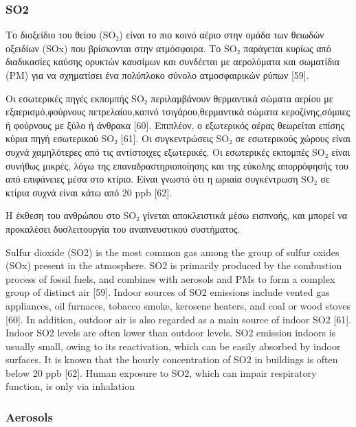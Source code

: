 \subsubsection{SO2}

Το διοξείδιο του θείου (SO₂) είναι το πιο κοινό αέριο στην ομάδα των θειωδών οξειδίων (SOx) που βρίσκονται στην ατμόσφαιρα. Το SO₂ παράγεται κυρίως από διαδικασίες καύσης ορυκτών καυσίμων και συνδέεται με αερολύματα και σωματίδια (PM) για να σχηματίσει ένα πολύπλοκο σύνολο ατμοσφαιρικών ρύπων [59].

Οι εσωτερικές πηγές εκπομπής SO₂ περιλαμβάνουν θερμαντικά σώματα αερίου με εξαερισμό,φούρνους πετρελαίου,καπνό τσιγάρου,θερμαντικά σώματα κεροζίνης,σόμπες ή φούρνους με ξύλο ή άνθρακα [60].
Επιπλέον, ο εξωτερικός αέρας θεωρείται επίσης κύρια πηγή εσωτερικού SO₂ [61]. Οι συγκεντρώσεις SO₂ σε εσωτερικούς χώρους είναι συχνά χαμηλότερες από τις αντίστοιχες εξωτερικές. Οι εσωτερικές εκπομπές SO₂ είναι συνήθως μικρές, λόγω της επαναδραστηριοποίησης και της εύκολης απορρόφησής του από επιφάνειες μέσα στο κτίριο. Είναι γνωστό ότι η ωριαία συγκέντρωση SO₂ σε κτίρια συχνά είναι κάτω από 20 ppb [62].

Η έκθεση του ανθρώπου στο SO₂ γίνεται αποκλειστικά μέσω εισπνοής, και μπορεί να προκαλέσει δυσλειτουργία του αναπνευστικού συστήματος.

Sulfur dioxide (SO2) is the most common gas among the group of sulfur oxides (SOx) present in the atmosphere. SO2 is primarily produced by the combustion process of fossil fuels, and combines with aerosols and PMs to form a complex group of distinct air [59]. Indoor sources of SO2 emissions include vented gas appliances, oil furnaces, tobacco smoke, kerosene heaters, and coal or wood stoves [60]. In addition, outdoor air is also regarded as a main source of indoor SO2 [61]. Indoor SO2 levels are often lower than outdoor levels. SO2 emission indoors is usually small, owing to its reactivation, which can be easily absorbed by indoor surfaces. It is known that the hourly concentration of SO2 in buildings is often below 20 ppb [62]. Human exposure to SO2, which can impair respiratory function, is only via inhalation

\cite{ijerph17238972}


\subsubsection{Aerosols}


